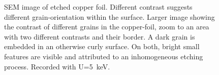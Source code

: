 	\begin{figure}\centering
		 \quad
		\caption{SEM image of etched copper foil. Different contrast suggests different grain-orientation within the surface.  Larger image showing the contrast of different grains in the copper-foil,  zoom to an area with two different contrasts and their border.  A dark grain is embedded in an otherwise curly surface. On both, bright small features are visible and attributed to an inhomogeneous etching process. Recorded with U=\SI{5}{\kilo \eV}.}
		\label{fig:SEM-gb}
	\end{figure}
	
